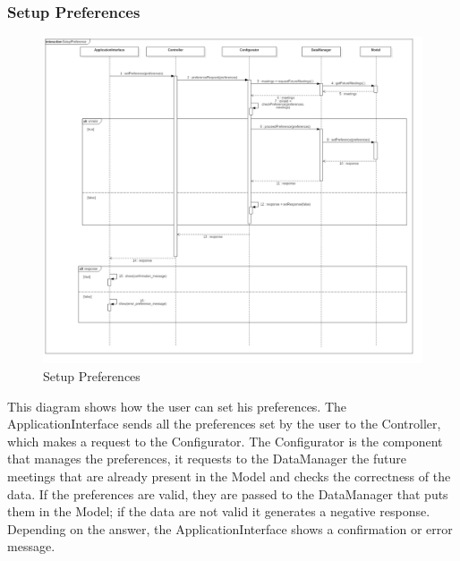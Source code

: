 \subsubsection{Setup Preferences}
\begin{figure}[H]
\centering
\includegraphics[scale=0.25]{images/SetupPreference}
\caption{Setup Preferences}
\end{figure}This diagram shows how the user can set his preferences. The ApplicationInterface sends all the preferences set by the user to the Controller, which makes a request to the Configurator. The Configurator is the component that manages the preferences, it requests to the DataManager the future meetings that are already present in the Model and checks the correctness of the data. If the preferences are valid, they are passed to the DataManager that puts them in the Model; if the data are not valid it generates a negative response. Depending on the answer, the ApplicationInterface shows a confirmation or error message.


